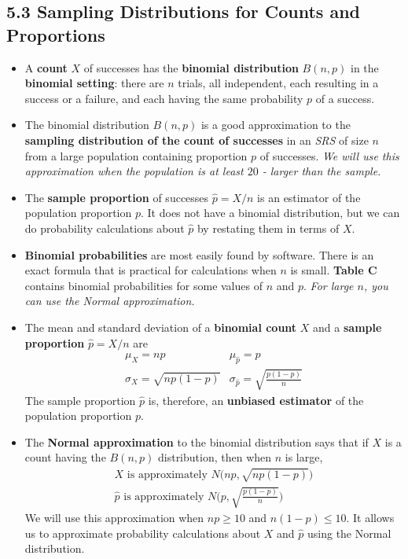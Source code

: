 	\subsection{5.3 Sampling Distributions for Counts and Proportions}
		\begin{itemize}
			\item A \textbf{count} $X$ of successes has the \textbf{binomial distribution} $B(n, p)$ in the \textbf{binomial setting}: there are $n$ trials, all independent, each resulting in a success or a failure, and each having the same probability $p$ of a success.
			
			\item The binomial distribution $B(n, p)$ is a good approximation to the \textbf{sampling distribution of the count of successes} in an \textit{SRS} of size $n$ from a large population containing proportion $p$ of successes. \textit{We will use this approximation when the population is at least $20$ - larger than the sample.}
			
			\item The \textbf{sample proportion} of successes $\hat{p}=X/n$ is an estimator of the population proportion $p$. It does not have a binomial distribution, but we can do probability calculations about $\hat{p}$ by restating them in terms of $X$.
			
			\item \textbf{Binomial probabilities} are most easily found by software. There is an exact formula that is practical for calculations when $n$ is small. \textbf{Table C} contains binomial probabilities for some values of $n$ and $p$. \textit{For large $n$, you can use the Normal approximation.}
			
			\item The mean and standard deviation of a \textbf{binomial count} $X$ and a \textbf{sample proportion} $\hat{p}=X/n$ are
			\[\begin{matrix}	
				\mu_{X} = np&\mu_{\hat{p}}=p\\
				\sigma_{X} =\sqrt{np(1-p)} & \sigma_{\hat{p}}=\sqrt{\frac{p(1-p)}{n}}\end{matrix} \]
			The sample proportion $\hat{p}$ is, therefore, an \textbf{unbiased estimator} of the population proportion $p$.
			
			\item The \textbf{Normal approximation} to the binomial distribution says that if $X$ is a count having the $B(n,p)$ distribution, then when $n$ is large,
			\[\begin{matrix}
				X \text{ is approximately } N\Big(np,\sqrt{np(1-p)}\Big)\\
				\hat{p} \text{ is approximately } N\Big(p,\sqrt{\frac{p(1-p)}{n}}\Big)
			\end{matrix}\]
			We will use this approximation when $np\geq 10$ and $n(1-p)\leq 10$. It allows us to approximate probability calculations about $X$ and $\hat{p}$ using the Normal distribution.
			

\end{itemize}
